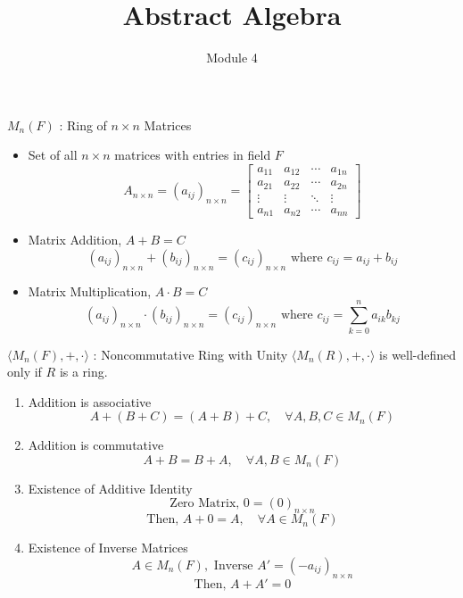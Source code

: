 \documentclass{beamer}
\title{Abstract Algebra}
\author{Module 4}
\institute{Section 24 : Noncommutative Examples}
\begin{document}
\begin{frame}
	\maketitle
\end{frame}

\begin{frame}{$M_n(F)$ : Ring of $n \times n$ Matrices}
\begin{definition}
\begin{itemize}
	\item Set of all $n \times n$ matrices with entries in field $F$
		\[ A_{n \times n} = (a_{ij})_{n \times n} = \begin{bmatrix} a_{11} & a_{12} & \cdots &  a_{1n} \\ a_{21} & a_{22} & \cdots & a_{2n} \\ \vdots & \vdots & \ddots & \vdots \\ a_{n1} & a_{n2}  & \cdots & a_{nn} \end{bmatrix} \]
	\item Matrix Addition, $A + B = C$
		\[ (a_{ij})_{n \times n} + (b_{ij})_{n \times n} = (c_{ij})_{n \times n} \text{ where }c_{ij} = a_{ij}+b_{ij} \]
	\item Matrix Multiplication, $A\cdot B = C$
		\[ (a_{ij})_{n \times n} \cdot (b_{ij})_{n \times n} = (c_{ij})_{n \times n} \text{ where } c_{ij} = \sum_{k=0}^n a_{ik}b_{kj} \]
\end{itemize}
\end{definition}
\end{frame}

\begin{frame}{$\langle M_n(F),+,\cdot \rangle$ : Noncommutative Ring with Unity}
\alert{$\langle M_n(R),+,\cdot \rangle$ is well-defined only if $R$ is a ring.}
\begin{enumerate}
	\item Addition is associative
		\[ A+(B+C) = (A+B)+C, \quad \forall A,B,C \in M_n(F)\]
	\item Addition is commutative
		\[ A + B = B+A,\quad \forall A,B \in M_n(F) \]
	\item Existence of Additive Identity
		\[ \text{Zero Matrix, }0 = (0)_{n \times n} \]
		\[ \text{Then, }A + 0 = A,\quad \forall A \in M_n(F) \]
	\item Existence of Inverse Matrices
		\[ A \in M_n(F), \text{ Inverse } A' = (-a_{ij})_{n \times n} \]
		\[ \text{Then, } A + A' = 0 \]
\end{enumerate}
\end{frame}
\end{document}
